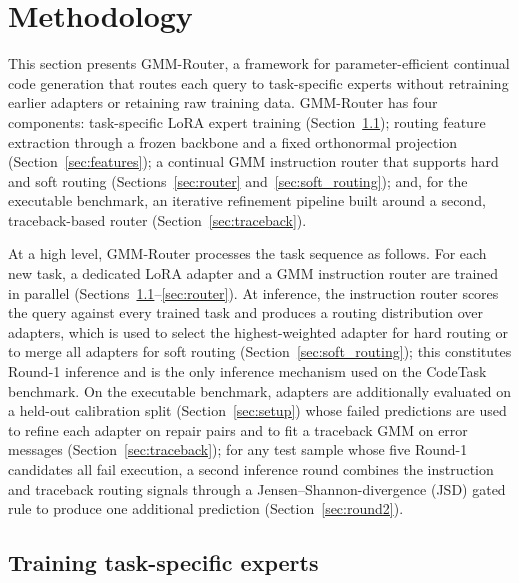 \section{Methodology}
\label{sec:methodology}

This section presents GMM-Router, a framework for parameter-efficient continual code generation that routes each query to task-specific experts without retraining earlier adapters or retaining raw training data. GMM-Router has four components: task-specific LoRA expert training (Section~\ref{sec:experts}); routing feature extraction through a frozen backbone and a fixed orthonormal projection (Section~\ref{sec:features}); a continual GMM instruction router that supports hard and soft routing (Sections~\ref{sec:router} and~\ref{sec:soft_routing}); and, for the executable benchmark, an iterative refinement pipeline built around a second, traceback-based router (Section~\ref{sec:traceback}).

At a high level, GMM-Router processes the task sequence as follows. For each new task, a dedicated LoRA adapter and a GMM instruction router are trained in parallel (Sections~\ref{sec:experts}--\ref{sec:router}). At inference, the instruction router scores the query against every trained task and produces a routing distribution over adapters, which is used to select the highest-weighted adapter for hard routing or to merge all adapters for soft routing (Section~\ref{sec:soft_routing}); this constitutes Round-1 inference and is the only inference mechanism used on the CodeTask benchmark. On the executable benchmark, adapters are additionally evaluated on a held-out calibration split (Section~\ref{sec:setup}) whose failed predictions are used to refine each adapter on repair pairs and to fit a traceback GMM on error messages (Section~\ref{sec:traceback}); for any test sample whose five Round-1 candidates all fail execution, a second inference round combines the instruction and traceback routing signals through a Jensen--Shannon-divergence (JSD) gated rule to produce one additional prediction (Section~\ref{sec:round2}).

\subsection{Training task-specific experts}
\label{sec:experts}

